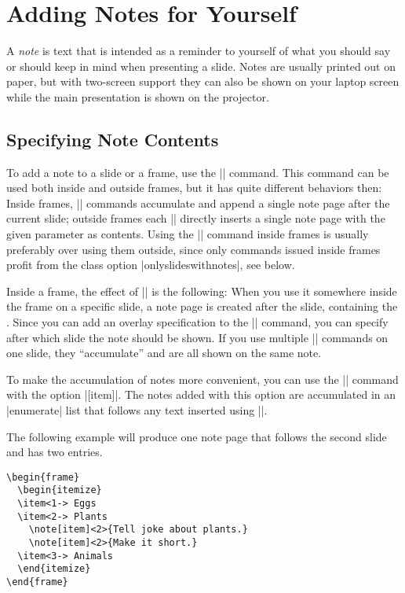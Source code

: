 %
%
%

\section{Adding Notes for Yourself}

A \emph{note} is text that is intended as a reminder to yourself of what you should say or should keep in mind when presenting a slide. Notes are usually printed out on paper, but with two-screen support they can also be shown on your laptop screen while the main presentation is shown on the projector.


\subsection{Specifying Note Contents}

To add a note to a slide or a frame, use the |\note| command. This command can be used both inside and outside frames, but it has quite different behaviors then: Inside frames, |\note| commands accumulate and append a single note page after the current slide; outside frames each |\note| directly inserts a single note page with the given parameter as contents. Using the |\note| command inside frames is usually preferably over using them outside, since only commands issued inside frames profit from the class option |onlyslideswithnotes|, see below.

Inside a frame, the effect of |\note| is the following: When you use it somewhere inside the frame on a specific slide, a note page is created after the slide, containing the . Since you can add an overlay specification to the |\note| command, you can specify after which slide the note should be shown. If you use multiple |\note| commands on one slide, they ``accumulate'' and are all shown on the same note.

To make the accumulation of notes more convenient, you can use the |\note| command with the option |[item]|. The notes added with this option are accumulated in an |enumerate| list that follows any text inserted using |\note|.

The following example will produce one note page that follows the second slide and has two entries.
\begin{verbatim}
\begin{frame}
  \begin{itemize}
  \item<1-> Eggs
  \item<2-> Plants
    \note[item]<2>{Tell joke about plants.}
    \note[item]<2>{Make it short.}
  \item<3-> Animals
  \end{itemize}
\end{frame}
\end{verbatim}

